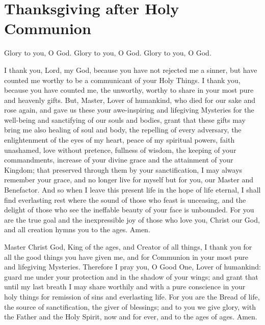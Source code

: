 \newpage
\section{Thanksgiving after Holy Communion}


Glory to you, O God. Glory to you, O God. Glory to you, O God.

I thank you, Lord, my God, because you have not rejected me a sinner, but have counted me worthy to be a communicant of your Holy Things. I thank you, because you have counted me, the unworthy, worthy to share in your most pure and heavenly gifts. But, Master, Lover of humankind, who died for our sake and rose again, and gave us these your awe-inspiring and lifegiving Mysteries for the well-being and sanctifying of our souls and bodies, grant that these gifts may bring me also healing of soul and body, the repelling of every adversary, the enlightenment of the eyes of my heart, peace of my spiritual powers, faith unashamed, love without pretence, fullness of wisdom, the keeping of your commandments, increase of your divine grace and the attainment of your Kingdom; that preserved through them by your sanctification, I may always remember your grace, and no longer live for myself but for you, our Master and Benefactor. And so when I leave this present life in the hope of life eternal, I shall find everlasting rest where the sound of those who feast is unceasing, and the delight of those who see the ineffable beauty of your face is unbounded. For you are the true goal and the inexpressible joy of those who love you, Christ our God, and all creation hymns you to the ages. Amen.


Master Christ God, King of the ages, and Creator of all things, I thank you for all the good things you have given me, and for Communion in your most pure and lifegiving Mysteries. Therefore I pray you, O Good One, Lover of humankind: guard me under your protection and in the shadow of your wings; and grant that until my last breath I may share worthily and with a pure conscience in your holy things for remission of sins and everlasting life. For you are the Bread of life, the source of sanctification, the giver of blessings; and to you we give glory, with the Father and the Holy Spirit, now and for ever, and to the ages of ages. Amen.

